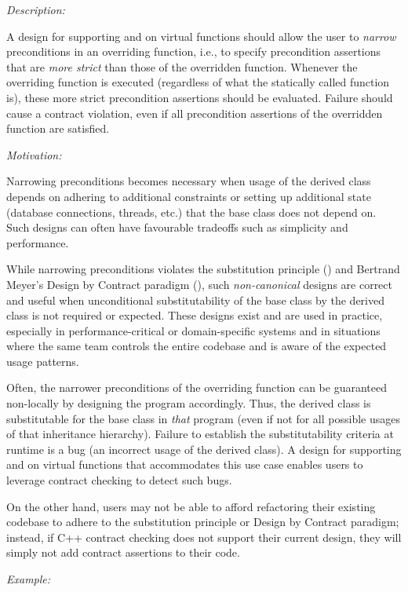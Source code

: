 \emph{Description:}

A design for supporting  and  on virtual functions should allow the user to \emph{narrow} preconditions in an overriding function, i.e., to specify precondition assertions 
 that are \emph{more strict} than those of the overridden function. Whenever the overriding function is executed (regardless of what the statically called function is), these more strict precondition assertions should be evaluated. Failure should cause a contract violation, even if all precondition assertions of the overridden function are satisfied.
 
 \emph{Motivation:}
 
Narrowing preconditions becomes necessary when usage of the derived class depends on adhering to additional constraints or setting up additional state (database connections, threads, etc.) that the base class does not depend on.  Such designs can often have favourable tradeoffs such as simplicity and performance.

While narrowing preconditions violates the substitution principle () and Bertrand Meyer's Design by Contract paradigm (), such \emph{non-canonical} designs are correct and useful when unconditional substitutability of the base class by the derived class is not required or expected. These designs exist and are used in practice, especially in performance-critical or domain-specific systems and in situations where the same team controls the entire codebase and is aware of the expected usage patterns.

Often, the narrower preconditions of the overriding function can be guaranteed non-locally by designing the program accordingly. Thus, the derived class is substitutable for the base class in \emph{that} program (even if not for all possible usages of that inheritance hierarchy). Failure to establish the substitutability criteria at runtime is a bug (an incorrect usage of the derived class). A design for supporting  and  on virtual functions that accommodates this use case enables users to leverage contract checking to detect such bugs. 

On the other hand, users may not be able to afford refactoring their existing codebase to adhere to the substitution principle or Design by Contract paradigm; instead, if C++ contract checking does not support their current design, they will simply not add contract assertions to their code.
 
 \emph{Example:}
 
